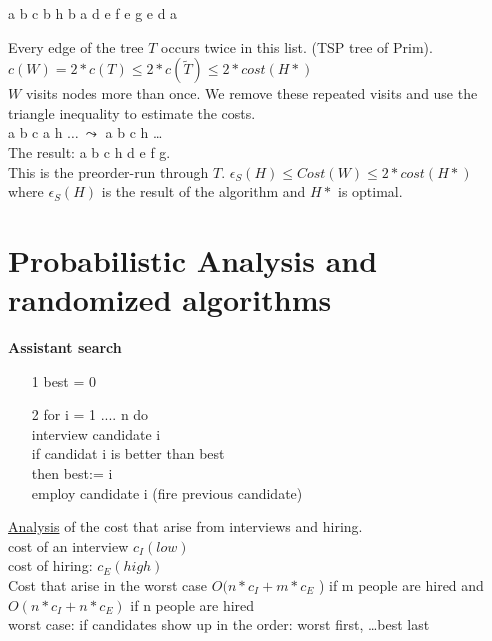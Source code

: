 \begin{example*}
a b c b h b a d e f e g e d a
\end{example*}
Every edge of the tree $T$ occurs twice in this list. (TSP tree of Prim).\\
$c(W) = 2*c(T) \le 2 * c(\widetilde{T}) \le 2 * cost (H*)$\\
$W$ visits nodes more than once. We remove these repeated visits and use the triangle inequality to
estimate the costs.\\
a b c a h $\ldots \: \leadsto$ a b c h \ldots\\
The result: a b c h d e f g.\\
This is the preorder-run through $T$.
$\epsilon_{S}(H) \le Cost(W) \le 2 * cost(H*)$ where $\epsilon_{S}(H)$ is the result of the algorithm and $H*$ is optimal.

\section{Probabilistic Analysis and randomized algorithms}

\textbf{Assistant search}
\begin{enumerate}
  \item[1] best = 0
  \item[2] for i = 1 .... n do\\
\noindent\hspace*{10mm}	interview candidate i\\
\noindent\hspace*{10mm}	if candidat i is better than best\\
\noindent\hspace*{20mm}		then best:= i\\
\noindent\hspace*{20mm}		employ candidate i (fire previous candidate)\\
\end{enumerate}

\underline{Analysis} of the cost that arise from interviews and hiring.\\
cost of an interview $c{_I}(low)$\\
cost of hiring: $c{_E}(high)$\\
Cost that arise in the worst case $O(n* c{_I} +  m * c{_E}$ ) if m people are hired 
and \\
$O(n * c{_I} +  n *  c{_E} )$ if n people are hired \\
worst case: if candidates show up in the order: worst first, \ldots best last

